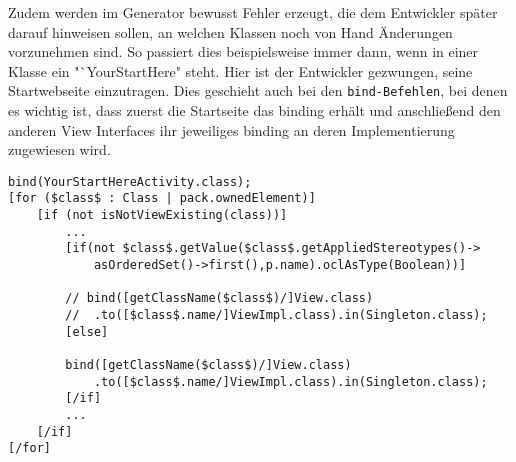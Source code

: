 Zudem werden im Generator bewusst Fehler erzeugt, die dem Entwickler später darauf hinweisen sollen, an welchen Klassen noch von Hand Änderungen vorzunehmen sind. So passiert dies beispielsweise immer dann, wenn in einer Klasse ein "`YourStartHere" steht. Hier ist der Entwickler gezwungen, seine Startwebseite einzutragen. Dies geschieht auch bei den \texttt{bind-Befehlen}, bei denen es wichtig ist, dass zuerst die Startseite das binding erhält und anschließend den anderen View Interfaces ihr jeweiliges binding an deren Implementierung zugewiesen wird.
\lstset{language=mtl}
\begin{lstlisting}[caption={Auszug aus der Generierung des \texttt{bind}-Befehls}, label={BSPCodeBind}]
bind(YourStartHereActivity.class);  
[for ($class$ : Class | pack.ownedElement)]
	[if (not isNotViewExisting(class))]
		...
		[if(not $class$.getValue($class$.getAppliedStereotypes()->
			asOrderedSet()->first(),p.name).oclAsType(Boolean))]

		// bind([getClassName($class$)/]View.class)
		//	.to([$class$.name/]ViewImpl.class).in(Singleton.class);
		[else]

		bind([getClassName($class$)/]View.class)
			.to([$class$.name/]ViewImpl.class).in(Singleton.class);
		[/if]		
		...
	[/if]	
[/for]
\end{lstlisting}

